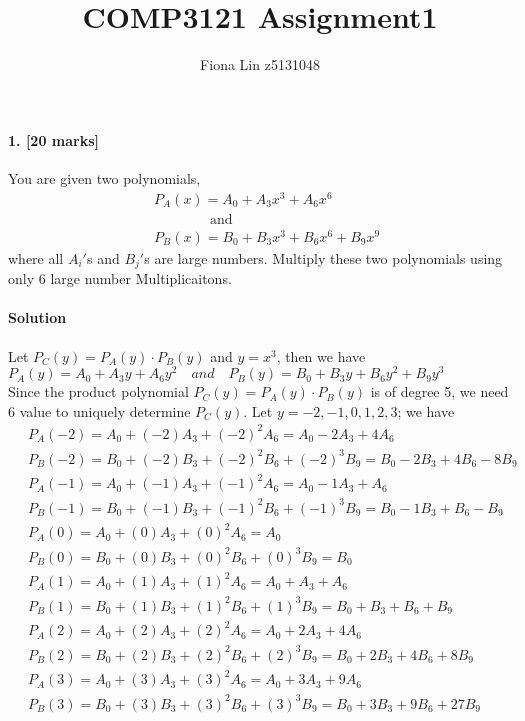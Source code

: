\documentclass[a4paper]{scrartcl}
\title{COMP3121 Assignment1}
\author{Fiona Lin z5131048}
\begin{document}
\maketitle
\paragraph{1. [20 marks]}
\label{sec:Question 1}
You are given two polynomials,
\begin{align*} &\
  P_A(x) = A_0 + A_3x^3+A_6x^6\\ &\
\qquad\qquad\text{and}\\ &\
  P_B(x) = B_0 + B_3x^3+B_6x^6+B_9x^9
\end{align*}
where all $A_i'$s and $B_j'$s are large numbers. Multiply these two polynomials using only 6 large number Multiplicaitons.
\paragraph{Solution}
Let $P_C(y)=P_A(y) \cdot P_B(y)$ and $y =x^3$, then we have\\
$P_A(y) = A_0 + A_3 y + A_6 y^2 \quad and\quad
P_B(y) = B_0 + B_3 y + B_6 y^2 + B_9 y^3$\\
Since the product polynomial $P_C(y) = P_A(y)\cdot P_B(y)$ is of degree 5, we need 6 value to uniquely determine $P_C(y)$. Let $y = -2,-1,0,1,2,3$; we have
\begin{align*}
&\
P_A(-2) = A_0 + (-2) A_3 + (-2)^2  A_6  = A_0 - 2A_3 + 4A_6 \\ &\
P_B(-2) = B_0 + (-2) B_3 + (-2)^2  B_6 + (-2)^3  B_9 = B_0 -2B_3 + 4B_6 - 8B_9\\ &\
P_A(-1) = A_0 + (-1) A_3 + (-1)^2  A_6  = A_0 - 1A_3 +  A_6 \\ &\
P_B(-1) = B_0 + (-1) B_3 + (-1)^2  B_6 + (-1)^3  B_9 = B_0 -1B_3 +  B_6 -  B_9\\ &\
P_A(0) = A_0 + (0) A_3 + (0)^2 A_6 = A_0 \\ &\
P_B(0) = B_0 + (0) B_3 + (0)^2 B_6 + (0)^3 B_9= B_0\\ &\
P_A(1) = A_0 + (1) A_3 + (1)^2 A_6 = A_0 +  A_3 +   A_6 \\ &\
P_B(1) = B_0 + (1) B_3 + (1)^2 B_6 + (1)^3 B_9= B_0 +  B_3 +  B_6 +   B_9\\ &\
P_A(2) = A_0 + (2) A_3 + (2)^2 A_6 = A_0 + 2A_3 +  4A_6 \\ &\
P_B(2) = B_0 + (2) B_3 + (2)^2 B_6 + (2)^3 B_9= B_0 + 2B_3 + 4B_6 + 8 B_9\\ &\
P_A(3) = A_0 + (3) A_3 + (3)^2 A_6 = A_0 + 3A_3 +  9A_6 \\ &\
P_B(3) = B_0 + (3) B_3 + (3)^2 B_6 + (3)^3 B_9= B_0 + 3B_3 + 9B_6 + 27B_9\\ &\
\end{align*}
\end{document}

